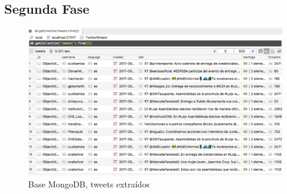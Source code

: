 \documentclass[lnbip,sechang,a4paper]{svmultln}
\begin{document}
\subsection{Segunda Fase}
\begin{figure}
\centering
\includegraphics[width=12cm]{tweet_mongo}
\caption{Base MongoDB, tweets extraídos }
\label{fig:dos}
\end{figure}
\end{document}
